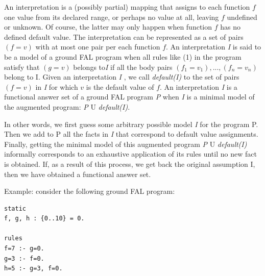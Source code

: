 \documentclass[a4paper,12pt]{report}
\begin{document}
An {\color{orange} interpretation} is a (possibly partial) mapping that assigns to each function $f$ one value from its declared range, or perhaps no value at all, leaving $f$ undefined or unknown. Of course, the latter may only happen when function $f$ has no defined default value. The interpretation can be represented as a set of pairs $(f=v)$ with at most one pair per each function $f$. An interpretation \textit{I} is said to be a {\color{orange}model} of a ground FAL program when all rules like (1) in the program satisfy that $(g=v)$ belongs to\textit{I} if all the body pairs $(f_1=v_1), ..., (f_n=v_n)$ belong to I. Given an interpretation \textit{I} , we call {\color{orange}\textit{default(I)}} to the set of pairs $(f=v)$ in \textit{I} for which $v$ is the default value of $f$. An interpretation \textit{I} is a {\color{orange}functional answer set} of a ground FAL program \textit{P} when \textit{I} is a minimal model of the augmented program: \textit{P} U \textit{default(I)}.

In other words, we first guess some arbitrary possible model \textit{I} for the program P. Then we add to P all the facts in \textit{I} that correspond to default value assignments. Finally, getting the minimal model of this augmented program \textit{P} U \textit{default(I)} informally corresponds to an exhaustive application of its rules until no new fact is obtained. If, as a result of this process, we get back the original assumption I, then we have obtained a functional answer set.


Example: consider the following ground FAL program:


\begin{verbatim}
static 
f, g, h : {0..10} = 0.

rules
f=7 :- g=0.
g=3 :- f=0.
h=5 :- g=3, f=0.
\end{verbatim}
\end{document}
